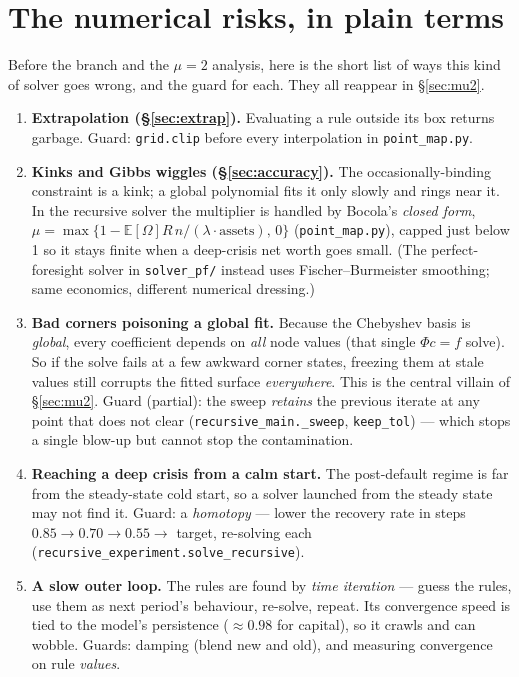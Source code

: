\documentclass[11pt]{article}
\newcommand{\E}{\mathbb{E}}
\newcommand{\code}[1]{\texttt{#1}}
\begin{document}
\section{The numerical risks, in plain terms}
\label{sec:risks}

Before the branch and the $\mu=2$ analysis, here is the short list of ways
this kind of solver goes wrong, and the guard for each. They all reappear in
\S\ref{sec:mu2}.

\begin{enumerate}
\item \textbf{Extrapolation (\S\ref{sec:extrap}).} Evaluating a rule outside
      its box returns garbage. Guard: \code{grid.clip} before every
      interpolation in \code{point\_map.py}.
\item \textbf{Kinks and Gibbs wiggles (\S\ref{sec:accuracy}).} The
      occasionally-binding constraint is a kink; a global polynomial fits it
      only slowly and rings near it. In the recursive solver the multiplier
      is handled by Bocola's \emph{closed form},
      $\mu=\max\{1-\E[\Omega]R\,n/(\lambda\cdot\text{assets}),\,0\}$
      (\code{point\_map.py}), capped just below 1 so it stays finite when a
      deep-crisis net worth goes small. (The perfect-foresight solver in
      \code{solver\_pf/} instead uses Fischer--Burmeister smoothing; same
      economics, different numerical dressing.)
\item \textbf{Bad corners poisoning a global fit.} Because the Chebyshev
      basis is \emph{global}, every coefficient depends on \emph{all} node
      values (that single $\Phi c=f$ solve). So if the solve fails at a few
      awkward corner states, freezing them at stale values still corrupts
      the fitted surface \emph{everywhere}. This is the central villain of
      \S\ref{sec:mu2}. Guard (partial): the sweep \emph{retains} the
      previous iterate at any point that does not clear
      (\code{recursive\_main.\_sweep}, \code{keep\_tol}) --- which stops a
      single blow-up but cannot stop the contamination.
\item \textbf{Reaching a deep crisis from a calm start.} The post-default
      regime is far from the steady-state cold start, so a solver launched
      from the steady state may not find it. Guard: a \emph{homotopy} ---
      lower the recovery rate in steps $0.85\to0.70\to0.55\to$ target,
      re-solving each (\code{recursive\_experiment.solve\_recursive}).
\item \textbf{A slow outer loop.} The rules are found by \emph{time
      iteration} --- guess the rules, use them as next period's behaviour,
      re-solve, repeat. Its convergence speed is tied to the model's
      persistence ($\approx0.98$ for capital), so it crawls and can wobble.
      Guards: damping (blend new and old), and measuring convergence on rule
      \emph{values}.
\end{enumerate}
\end{document}
